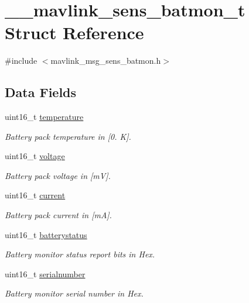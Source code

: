 \hypertarget{struct____mavlink__sens__batmon__t}{\section{\+\_\+\+\_\+mavlink\+\_\+sens\+\_\+batmon\+\_\+t Struct Reference}
\label{struct____mavlink__sens__batmon__t}
}


{\ttfamily \#include $<$mavlink\+\_\+msg\+\_\+sens\+\_\+batmon.\+h$>$}

\subsection*{Data Fields}
\begin{DoxyCompactItemize}
\item 
uint16\+\_\+t \hyperlink{struct____mavlink__sens__batmon__t_a7b46f27d98753a6c2091360b7598b7e6}{temperature}
\begin{DoxyCompactList}\small\item\em Battery pack temperature in \mbox{[}0. K\mbox{]}. \end{DoxyCompactList}\item 
uint16\+\_\+t \hyperlink{struct____mavlink__sens__batmon__t_a7d8816a1eb4c48924f53ded5508e145e}{voltage}
\begin{DoxyCompactList}\small\item\em Battery pack voltage in \mbox{[}m\+V\mbox{]}. \end{DoxyCompactList}\item 
uint16\+\_\+t \hyperlink{struct____mavlink__sens__batmon__t_a59e52dfa86a09741bc194f7fa8595d51}{current}
\begin{DoxyCompactList}\small\item\em Battery pack current in \mbox{[}m\+A\mbox{]}. \end{DoxyCompactList}\item 
uint16\+\_\+t \hyperlink{struct____mavlink__sens__batmon__t_a6c78470738a08381fa1671c5f7e0121d}{batterystatus}
\begin{DoxyCompactList}\small\item\em Battery monitor status report bits in Hex. \end{DoxyCompactList}\item 
uint16\+\_\+t \hyperlink{struct____mavlink__sens__batmon__t_ad5a8891e7c15871d15c4825a12bc3fa7}{serialnumber}
\begin{DoxyCompactList}\small\item\em Battery monitor serial number in Hex. \end{DoxyCompactList}\item 

\end{DoxyCompactItemize}

